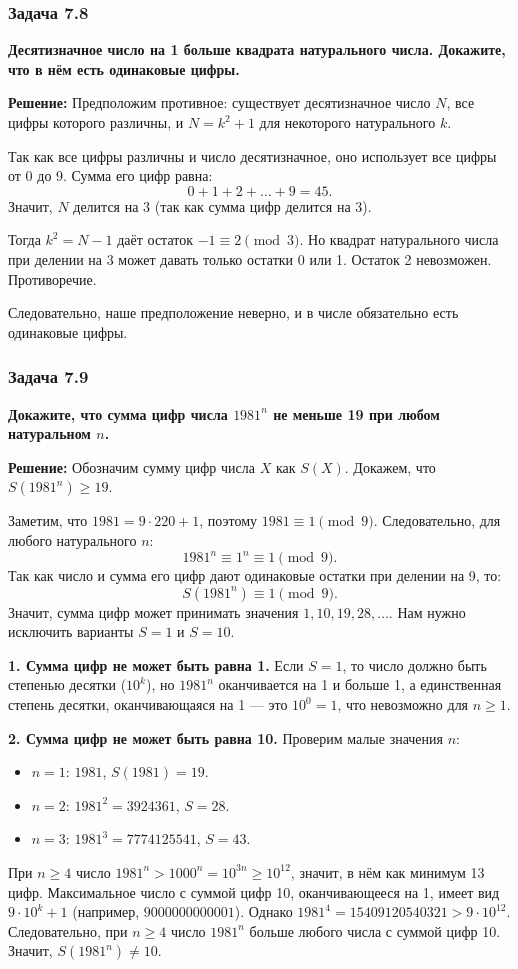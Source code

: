 \documentclass[12pt, a4paper]{article}
\begin{document}
\subsubsection*{Задача 7.8}
\textbf{Десятизначное число на 1 больше квадрата натурального числа. Докажите, что в нём есть одинаковые цифры.}

\textbf{Решение:}
Предположим противное: существует десятизначное число $N$, все цифры которого различны, и $N = k^2 + 1$ для некоторого натурального $k$.

Так как все цифры различны и число десятизначное, оно использует все цифры от 0 до 9. Сумма его цифр равна:
\[
0 + 1 + 2 + \dots + 9 = 45.
\]
Значит, $N$ делится на 3 (так как сумма цифр делится на 3).

Тогда $k^2 = N - 1$ даёт остаток $-1 \equiv 2 \pmod{3}$. Но квадрат натурального числа при делении на 3 может давать только остатки 0 или 1. Остаток 2 невозможен. Противоречие.

Следовательно, наше предположение неверно, и в числе обязательно есть одинаковые цифры.

\subsubsection*{Задача 7.9}
\textbf{Докажите, что сумма цифр числа \(1981^n\) не меньше 19 при любом натуральном $n$.}

\textbf{Решение:}
Обозначим сумму цифр числа \(X\) как \(S(X)\). Докажем, что \(S(1981^n) \ge 19\).

Заметим, что \(1981 = 9 \cdot 220 + 1\), поэтому \(1981 \equiv 1 \pmod{9}\). Следовательно, для любого натурального \(n\):
\[
1981^n \equiv 1^n \equiv 1 \pmod{9}.
\]
Так как число и сумма его цифр дают одинаковые остатки при делении на 9, то:
\[
S(1981^n) \equiv 1 \pmod{9}.
\]
Значит, сумма цифр может принимать значения \(1, 10, 19, 28, \dots\). Нам нужно исключить варианты \(S = 1\) и \(S = 10\).

\textbf{1. Сумма цифр не может быть равна 1.} Если \(S = 1\), то число должно быть степенью десятки (\(10^k\)), но \(1981^n\) оканчивается на 1 и больше 1, а единственная степень десятки, оканчивающаяся на 1 — это \(10^0 = 1\), что невозможно для \(n \ge 1\).

\textbf{2. Сумма цифр не может быть равна 10.} 
Проверим малые значения \(n\):
\begin{itemize}
    \item \(n=1\): \(1981\), \(S(1981) = 19\).
    \item \(n=2\): \(1981^2 = 3924361\), \(S = 28\).
    \item \(n=3\): \(1981^3 = 7774125541\), \(S = 43\).
\end{itemize}
При \(n \ge 4\) число \(1981^n > 1000^n = 10^{3n} \ge 10^{12}\), значит, в нём как минимум 13 цифр.
Максимальное число с суммой цифр 10, оканчивающееся на 1, имеет вид \(9 \cdot 10^k + 1\) (например, \(9000000000001\)). Однако \(1981^4 = 15409120540321 > 9 \cdot 10^{12}\). Следовательно, при \(n \ge 4\) число \(1981^n\) больше любого числа с суммой цифр 10. Значит, \(S(1981^n) \neq 10\).
\end{document}
